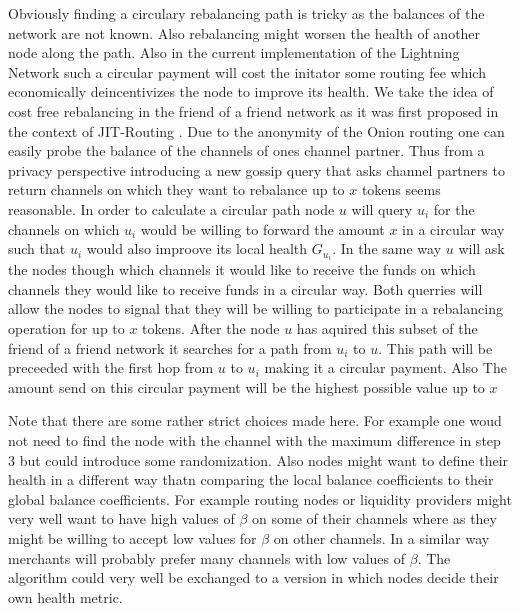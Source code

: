 \documentclass[a4paper]{paper}
\begin{document}
Obviously finding a circulary rebalancing path is tricky as the balances of the network are not known.
Also rebalancing might worsen the health of another node along the path.
Also in the current implementation of the Lightning Network such a circular payment will cost the initator some routing fee which economically deincentivizes the node to improve its health.
We take the idea of cost free rebalancing in the friend of a friend network as it was first proposed in the context of JIT-Routing \cite{pickhardt2019jit}.
Due to the anonymity of the Onion routing one can easily probe the balance of the channels of ones channel partner.
Thus from a privacy perspective introducing a new gossip query that asks channel partners to return channels on which they want to rebalance up to $x$ tokens seems reasonable.
In order to calculate a circular path node $u$ will query $u_i$ for the channels on which $u_i$ would be willing to forward the amount $x$ in a circular way such that $u_i$ would also improove its local health $G_{u_i}$.
In the same way $u$ will ask the nodes though which channels it would like to receive the funds on which channels they would like to receive funds in a circular way.
Both querries will allow the nodes to signal that they will be willing to participate in a rebalancing operation for up to $x$ tokens.
After the node $u$ has aquired this subset of the friend of a friend network it searches for a path from $u_i$ to $u$.
This path will be preceeded with the first hop from $u$ to $u_i$ making it a circular payment.
Also The amount send on this circular payment will be the highest possible value up to $x$

Note that there are some rather strict choices made here.
For example one woud not need to find the node with the channel with the maximum difference in step 3 but could introduce some randomization.
Also nodes might want to define their health in a different way thatn comparing the local balance coefficients to their global balance coefficients.
For example routing nodes or liquidity providers might very well want to have high values of $\beta$ on some of their channels where as they might be willing to accept low values for $\beta$ on other channels.
In a similar way merchants will probably prefer many channels with low values of $\beta$.
The algorithm could very well be exchanged to a version in which nodes decide their own health metric.

\end{document}

